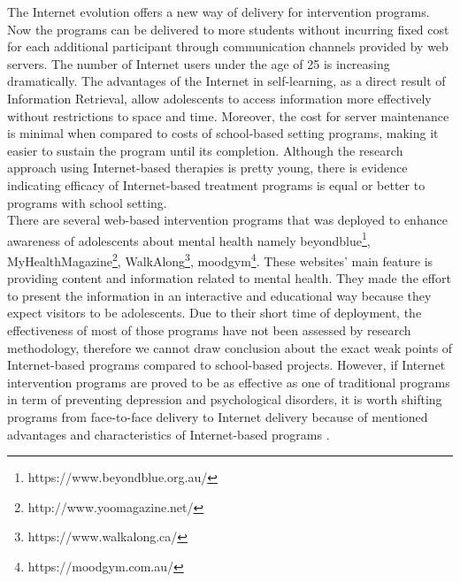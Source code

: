 The Internet evolution offers a new way of delivery for intervention programs. Now the programs can be delivered to more students without incurring fixed cost for each additional participant through communication channels provided by web servers. The number of Internet users under the age of 25 is increasing dramatically. The advantages of the Internet in self-learning, as a direct result of Information Retrieval, allow adolescents to access information more effectively without restrictions to space and time. Moreover, the cost for server maintenance is minimal when compared to costs of school-based setting programs, making it easier to sustain the program until its completion. Although the research approach using Internet-based therapies is pretty young, there is evidence indicating efficacy of Internet-based treatment programs is equal or better to programs with school setting.\\
There are several web-based intervention programs that was deployed to enhance awareness of adolescents about mental health namely beyondblue\footnote{https://www.beyondblue.org.au/}, MyHealthMagazine\footnote{http://www.yoomagazine.net/}, WalkAlong\footnote{https://www.walkalong.ca/}, moodgym\footnote{https://moodgym.com.au/}. These websites' main feature is providing content and information related to mental health. They made the effort to present the information in an interactive and educational way because they expect visitors to be adolescents. Due to their short time of deployment, the effectiveness of most of those programs have not been assessed by research methodology, therefore we cannot draw conclusion about the exact weak points of Internet-based programs compared to school-based projects. However, if Internet intervention programs are proved to be as effective as one of traditional programs in term of preventing depression and psychological disorders, it is worth shifting programs from face-to-face delivery to Internet delivery because of mentioned advantages and characteristics of Internet-based programs \cite{Huen2016}.\\
